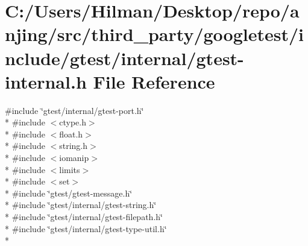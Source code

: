 \hypertarget{gtest-internal_8h}{}\section{C\+:/\+Users/\+Hilman/\+Desktop/repo/anjing/src/third\+\_\+party/googletest/include/gtest/internal/gtest-\/internal.h File Reference}
\label{gtest-internal_8h}
{\ttfamily \#include \char`\"{}gtest/internal/gtest-\/port.\+h\char`\"{}}\\*
{\ttfamily \#include $<$ctype.\+h$>$}\\*
{\ttfamily \#include $<$float.\+h$>$}\\*
{\ttfamily \#include $<$string.\+h$>$}\\*
{\ttfamily \#include $<$iomanip$>$}\\*
{\ttfamily \#include $<$limits$>$}\\*
{\ttfamily \#include $<$set$>$}\\*
{\ttfamily \#include \char`\"{}gtest/gtest-\/message.\+h\char`\"{}}\\*
{\ttfamily \#include \char`\"{}gtest/internal/gtest-\/string.\+h\char`\"{}}\\*
{\ttfamily \#include \char`\"{}gtest/internal/gtest-\/filepath.\+h\char`\"{}}\\*
{\ttfamily \#include \char`\"{}gtest/internal/gtest-\/type-\/util.\+h\char`\"{}}\\*

